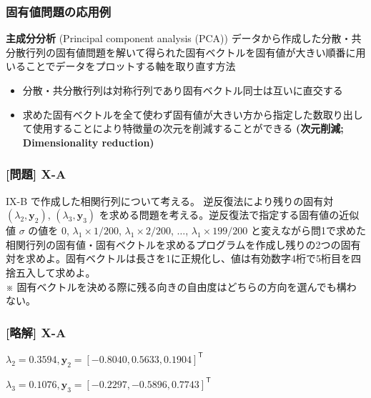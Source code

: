 \documentclass[dvipdfmx,aspectratio=169,20pt]{beamer}
\newcommand{\myfontsetting}[3]{{\fontsize{#1}{#2}\selectfont #3}}
\begin{document}
\begin{frame}
\frametitle{\large 固有値問題の応用例}

\begin{block}{\myfontsetting{20pt}{20pt}{\bf 主成分分析} {\small (Principal component analysis (PCA))}}
\myfontsetting{15pt}{15pt}{
    データから作成した分散・共分散行列の固有値問題を解いて得られた固有ベクトルを固有値が大きい順番に用いることでデータをプロットする軸を取り直す方法
}
\end{block}

\vspace{-2mm}

\begin{itemize}
    \item \myfontsetting{12pt}{12pt}{
    分散・共分散行列は対称行列であり固有ベクトル同士は互いに直交する
    }
    \item \myfontsetting{12pt}{12pt}{
    求めた固有ベクトルを全て使わず固有値が大きい方から指定した数取り出して使用することにより特徴量の次元を削減することができる {\bf (次元削減; Dimensionality reduction)}
    }
\end{itemize}
\end{frame}
\begin{frame}
\frametitle{[問題] X-A}


\myfontsetting{15pt}{17pt}{
{I\hspace{-.1em}X-B} で作成した相関行列について考える。
逆反復法により残りの固有対 $(\lambda_2, \bm{y}_2)$, $(\lambda_3, \bm{y}_3)$ を求める問題を考える。逆反復法で指定する固有値の近似値 $\sigma$ の値を $0$, $\lambda_1\times 1/200$, $\lambda_1\times 2/200$, $\dots$, $\lambda_1\times 199/200$ と変えながら問1で求めた相関行列の固有値・固有ベクトルを求めるプログラムを作成し残りの2つの固有対を求めよ。固有ベクトルは長さを1に正規化し、値は有効数字4桁で5桁目を四捨五入して求めよ。%
}\\
\myfontsetting{10pt}{10pt}{
※ 固有ベクトルを決める際に残る向きの自由度はどちらの方向を選んでも構わない。
}
\end{frame}
\begin{frame}
\frametitle{[略解] X-A}

$\lambda_2 = 0.3594, \bm{y}_2 = [-0.8040, 0.5633, 0.1904]^\mathsf{T}$

$\lambda_3 = 0.1076, \bm{y}_3 = [-0.2297, -0.5896, 0.7743]^\mathsf{T}$

\end{frame}
\end{document}
